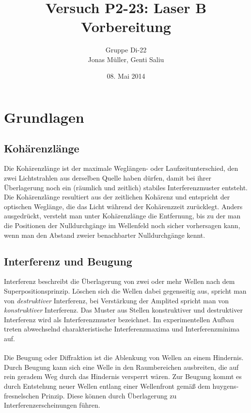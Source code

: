 \documentclass[a4paper,titlepage]{scrartcl}
\title{Versuch P2-23: Laser B\\Vorbereitung}
\author{Gruppe Di-22\\Jonas Müller, Genti Saliu}
\date{08. Mai 2014}
\numberwithin{equation}{section}
\begin{document}
	\begin{titlepage}
		\maketitle
		\thispagestyle{empty}
	\end{titlepage}
	
\newpage
{}
\tableofcontents

\newpage
{}

\section{Grundlagen}
\subsection{Kohärenzlänge}
Die Kohärenzlänge ist der maximale Weglängen- oder Laufzeitunterschied, den zwei Lichtstrahlen aus derselben Quelle haben dürfen, damit bei ihrer Überlagerung noch ein (räumlich und zeitlich) stabiles Interferenzmuster entsteht. Die Kohärenzlänge resultiert aus der zeitlichen Kohärenz und entspricht der optischen Weglänge, die das Licht während der Kohärenzzeit zurücklegt. Anders ausgedrückt, versteht man unter Kohärenzlänge die Entfernung, bis zu der man die Positionen der Nulldurchgänge im Wellenfeld noch sicher vorhersagen kann, wenn man den Abstand zweier benachbarter Nulldurchgänge kennt. 
\subsection{Interferenz und Beugung}
Interferenz beschreibt die Überlagerung von zwei oder mehr Wellen nach dem Superpositionsprinzip. Löschen sich die Wellen dabei gegenseitig aus, spricht man von \emph{destruktiver} Interferenz, bei Verstärkung der Amplited spricht man von \emph{konstruktiver} Interferenz. Das Muster aus Stellen konstruktiver und destruktiver Interferenz wird als Interferenzmuster bezeichnet. Im experimentellen Aufbau treten abwechselnd charakteristische Interferenzmaxima und Interferenzminima auf.\\ \\
Die Beugung oder Diffraktion ist die Ablenkung von Wellen an einem Hindernis. Durch Beugung kann sich eine Welle in den Raumbereichen ausbreiten, die auf rein geradem Weg durch das Hindernis versperrt wären. Zur Beugung kommt es durch Entstehung neuer Wellen entlang einer Wellenfront gemäß dem huygens-fresnelschen Prinzip. Diese können durch Überlagerung zu Interferenzerscheinungen führen.
\end{document}
